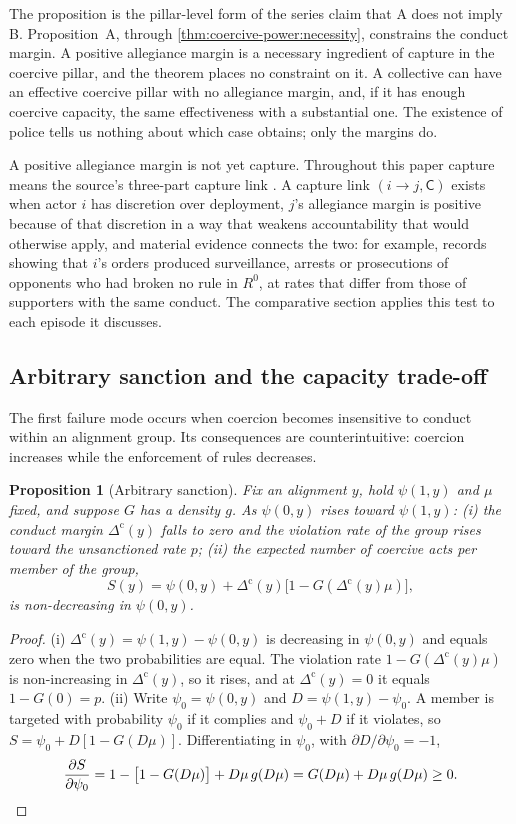 \documentclass[11pt,letterpaper]{article}
\newtheorem{proposition}[theorem]{Proposition}
\theoremstyle{definition}
\theoremstyle{remark}
\newcommand{\pC}{\mathsf{C}}
\begin{document}
The proposition is the pillar-level form of the series claim that A does not imply B. Proposition~A, through \cref{thm:coercive-power:necessity}, constrains the conduct margin. A positive allegiance margin is a necessary ingredient of capture in the coercive pillar, and the theorem places no constraint on it. A collective can have an effective coercive pillar with no allegiance margin, and, if it has enough coercive capacity, the same effectiveness with a substantial one. The existence of police tells us nothing about which case obtains; only the margins do.

A positive allegiance margin is not yet capture. Throughout this paper capture means the source's three-part capture link \citep{largo2026hbs}. A capture link $(i \to j, \pC)$ exists when actor $i$ has discretion over deployment, $j$'s allegiance margin is positive because of that discretion in a way that weakens accountability that would otherwise apply, and material evidence connects the two: for example, records showing that $i$'s orders produced surveillance, arrests or prosecutions of opponents who had broken no rule in $R^0$, at rates that differ from those of supporters with the same conduct. The comparative section applies this test to each episode it discusses.

\subsection{Arbitrary sanction and the capacity trade-off}

The first failure mode occurs when coercion becomes insensitive to conduct within an alignment group. Its consequences are counterintuitive: coercion increases while the enforcement of rules decreases.

\begin{proposition}[Arbitrary sanction]
\label{prop:coercive-power:arbitrary}
Fix an alignment $y$, hold $\psi(1,y)$ and $\mu$ fixed, and suppose $G$ has a density $g$. As $\psi(0,y)$ rises toward $\psi(1,y)$: (i) the conduct margin $\Delta^{\mathrm{c}}(y)$ falls to zero and the violation rate of the group rises toward the unsanctioned rate $p$; (ii) the expected number of coercive acts per member of the group,
\[
S(y) = \psi(0,y) + \Delta^{\mathrm{c}}(y)\bigl[1 - G(\Delta^{\mathrm{c}}(y)\mu)\bigr],
\]
is non-decreasing in $\psi(0,y)$.
\end{proposition}

\begin{proof}
(i) $\Delta^{\mathrm{c}}(y) = \psi(1,y) - \psi(0,y)$ is decreasing in $\psi(0,y)$ and equals zero when the two probabilities are equal. The violation rate $1 - G(\Delta^{\mathrm{c}}(y)\mu)$ is non-increasing in $\Delta^{\mathrm{c}}(y)$, so it rises, and at $\Delta^{\mathrm{c}}(y) = 0$ it equals $1 - G(0) = p$. (ii) Write $\psi_0 = \psi(0,y)$ and $D = \psi(1,y) - \psi_0$. A member is targeted with probability $\psi_0$ if it complies and $\psi_0 + D$ if it violates, so $S = \psi_0 + D[1 - G(D\mu)]$. Differentiating in $\psi_0$, with $\partial D/\partial \psi_0 = -1$,
\[
\frac{\partial S}{\partial \psi_0} = 1 - \bigl[1 - G(D\mu)\bigr] + D\mu\, g(D\mu) = G(D\mu) + D\mu\, g(D\mu) \ge 0. \qedhere
\]
\end{proof}
\end{document}
